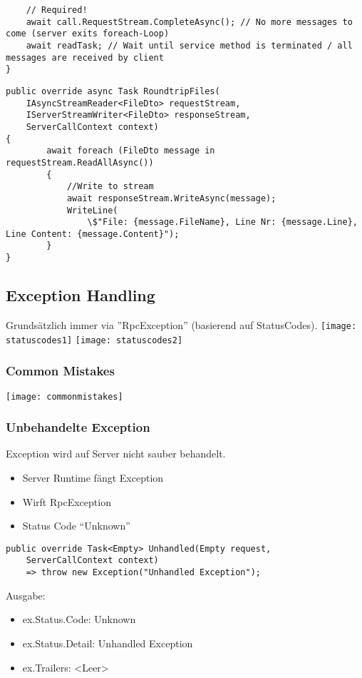 \begin{multicols*}{2}
\begin{lstlisting}
    // Required!
    await call.RequestStream.CompleteAsync(); // No more messages to come (server exits foreach-Loop) 
    await readTask; // Wait until service method is terminated / all messages are received by client
}
\end{lstlisting}
\begin{lstlisting}
public override async Task RoundtripFiles(
    IAsyncStreamReader<FileDto> requestStream, 
    IServerStreamWriter<FileDto> responseStream, 
    ServerCallContext context)
{
        await foreach (FileDto message in requestStream.ReadAllAsync())
        {
            //Write to stream
            await responseStream.WriteAsync(message);
            WriteLine(
                \$"File: {message.FileName}, Line Nr: {message.Line}, Line Content: {message.Content}");
        }
}
\end{lstlisting}
\subsection{Exception Handling}
Grundsätzlich immer via ''RpcException'' (basierend auf StatusCodes).
\texttt{[image: statuscodes1]}
\texttt{[image: statuscodes2]}
\subsubsection{Common Mistakes}
\texttt{[image: commonmistakes]}
\subsubsection{Unbehandelte Exception}
Exception wird auf Server nicht sauber behandelt.
\begin{itemize}
    \item Server Runtime fängt Exception
    \item Wirft RpcException
    \item Status Code “Unknown”
\end{itemize}
\begin{lstlisting}
public override Task<Empty> Unhandled(Empty request,
    ServerCallContext context)
    => throw new Exception("Unhandled Exception");
\end{lstlisting}
Ausgabe:
\begin{itemize}
    \item ex.Status.Code: Unknown
    \item ex.Status.Detail: Unhandled Exception
    \item ex.Trailers: <Leer>
\end{itemize}

\end{multicols*}
